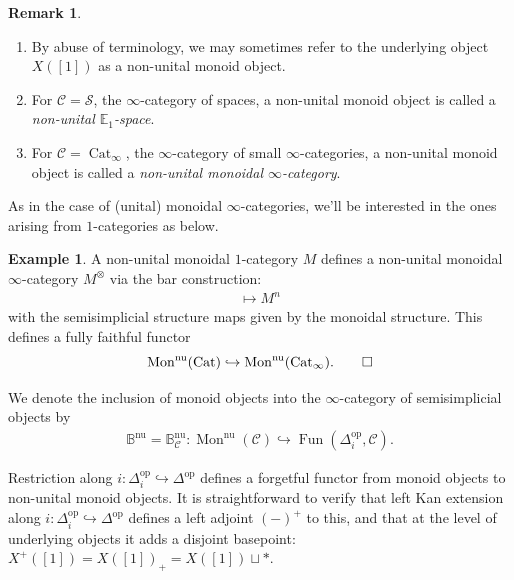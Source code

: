 \documentclass[12pt, reqno]{amsart}
\theoremstyle{plain}
\theoremstyle{definition}
\newtheorem{example}[theorem]{Example}
\newtheorem{remark}[theorem]{Remark}
\begin{document}
\begin{remark} \ 
\begin{enumerate}
\item By abuse of terminology, we may sometimes refer to the underlying object $X([1])$ as a non-unital monoid object.
\item For $\mathcal{C}=\mathcal{S}$, the $\infty$-category of spaces, a non-unital monoid object is called a \textit{non-unital $\mathbb{E}_1$-space}.
\item For $\mathcal{C}=\operatorname{Cat}_\infty$, the $\infty$-category of small $\infty$-categories, a non-unital monoid object is called a \textit{non-unital monoidal $\infty$-category}.\qedhere
\end{enumerate}
\end{remark}

As in the case of (unital) monoidal $\infty$-categories, we'll be interested in the ones arising from $1$-categories as below.

\begin{example}
A non-unital monoidal $1$-category $M$ defines a non-unital monoidal $\infty$-category $M^\otimes$ via the bar construction:
\begin{align*}
[n]\mapsto M^n
\end{align*}
with the semisimplicial structure maps given by the monoidal structure. This defines a fully faithful functor
\begin{equation*}
\operatorname{Mon}^{\operatorname{nu}}(\operatorname{Cat})\hookrightarrow \operatorname{Mon}^{\operatorname{nu}}(\operatorname{Cat}_\infty).\qedhere
\end{equation*}
\end{example}


We denote the inclusion of monoid objects into the $\infty$-category of semisimplicial objects by
\begin{align*}
\mathbb{B}^{\operatorname{nu}}=\mathbb{B}^{\operatorname{nu}}_\mathcal{C}\colon \operatorname{Mon}^{\operatorname{nu}}(\mathcal{C})\hookrightarrow \operatorname{Fun}(\Delta_i^{\operatorname{op}},\mathcal{C}).
\end{align*}

Restriction along $i\colon \Delta_i^{\operatorname{op}}\hookrightarrow \Delta^{\operatorname{op}}$ defines a forgetful functor from monoid objects to non-unital monoid objects. It is straightforward to verify that left Kan extension along $i\colon \Delta_i^{\operatorname{op}}\hookrightarrow \Delta^{\operatorname{op}}$ defines a left adjoint $(-)^+$ to this, and that at the level of underlying objects it adds a disjoint basepoint: $X^+([1])=X([1])_+=X([1])\sqcup \ast$.
\end{document}
